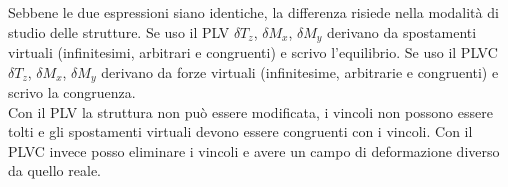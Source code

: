 Sebbene le due espressioni siano identiche, la differenza risiede nella modalità di studio delle strutture.
Se uso il PLV $\delta T_z$, $\delta M_x$, $\delta M_y$ derivano da spostamenti virtuali (infinitesimi, arbitrari e congruenti) e scrivo l'equilibrio.
Se uso il PLVC $\delta T_z$, $\delta M_x$, $\delta M_y$ derivano da forze virtuali (infinitesime, arbitrarie e congruenti) e scrivo la congruenza.\\

Con il PLV la struttura non può essere modificata, i vincoli non possono essere tolti e gli spostamenti virtuali devono essere congruenti con i vincoli. Con il PLVC invece posso eliminare i vincoli e avere un campo di deformazione diverso da quello reale.









